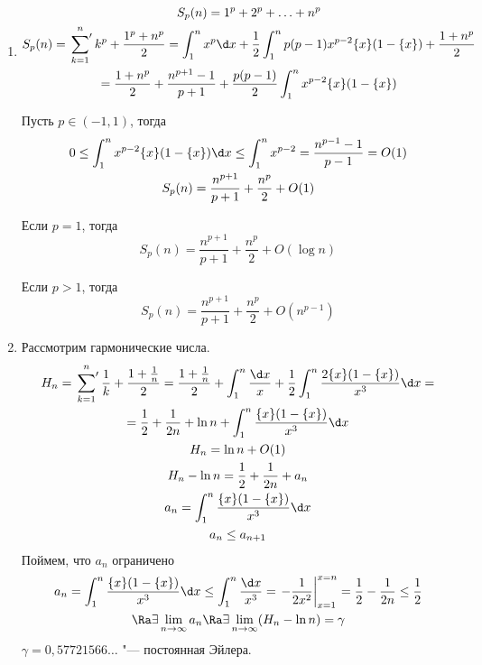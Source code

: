 ﻿\begin{exmp}
	\begin{enumerate}
	\item
		\begin{gather*}
			S_p(n) = 1^p + 2^p + \ldots + n^p \\
			S_p(n) = \sideset{}{'}\sum_{k = 1}^{n} k^p + \frac{1^p + n^p}{2} =
				\int_1^n x^p \d x + \frac{1}{2}\int_1^n p(p - 1)x^{p - 2}\{x\}(1 - \{x\}) + \frac{1 + n^p}{2} \\
			= \frac{1 + n^p}{2} + \frac{n^{p + 1} - 1}{p + 1} + \frac{p(p - 1)}{2}\int_1^n x^{p - 2}\{x\}(1 - \{x\})
		\end{gather*}

		Пусть $p \in (-1, 1)$, тогда
		\begin{gather*}
			0 \le \int_1^n x^{p - 2}\{x\}(1 - \{x\})\d x \le \int_1^{n}x^{p - 2} =
				\frac{n^{p - 1} - 1}{p - 1} = O(1) \\
			S_p(n) = \frac{n^{p + 1}}{p + 1} + \frac{n^p}{2} + O(1)
		\end{gather*}

		Если $p = 1$, тогда
		\[ S_p(n) = \frac{n^{p + 1}}{p + 1} + \frac{n^p}{2} + O(\log n) \]

		Если $p > 1$, тогда
		\[ S_p(n) = \frac{n^{p + 1}}{p + 1} + \frac{n^p}{2} + O(n^{p - 1}) \]

	\item
		Рассмотрим гармонические числа.
		\begin{gather*}
			H_n = \sideset{}{'}\sum_{k = 1}^n \frac{1}{k} + \frac{1 + \frac{1}{n}}{2} =
				\frac{1 + \frac{1}{n}}{2} + \int_1^{n}\frac{\d x}{x} + \frac{1}{2}\int_1^n\frac{2\{x\}(1 - \{x\})}{x^3}\d x = \\
			= \frac{1}{2} + \frac{1}{2n} + \ln n + \int_1^n\frac{\{x\}(1 - \{x\})}{x^3}\d x \\
			H_n = \ln n + O(1) \\
			H_n - \ln n = \frac{1}{2} + \frac{1}{2n} + a_n \\
			a_n = \int_1^n\frac{\{x\}(1 - \{x\})}{x^3}\d x \\
			a_n \le a_{n + 1}
		\end{gather*}
		Поймем, что $a_n$ ограничено
		\begin{gather*}
			a_n = \int_1^n\frac{\{x\}(1 - \{x\})}{x^3}\d x \le
				\int_1^{n}\frac{\d x}{x^3} = \left. -\frac{1}{2x^2}\right |_{x = 1}^{x = n} =
				\frac{1}{2} - \frac{1}{2n} \le \frac{1}{2} \\
			\Ra \exists \lim_{n \to \infty} a_n \Ra \exists \lim_{n \to \infty}(H_n - \ln n) = \gamma
		\end{gather*}
		$\gamma = 0,57721566\ldots$ "--- постоянная Эйлера.


\end{enumerate}
\end{exmp}
